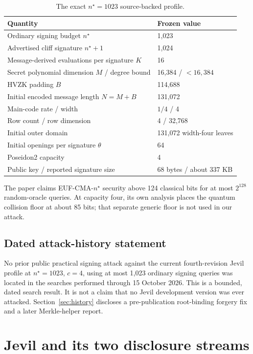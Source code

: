 \documentclass[10pt,a4paper]{article}
\begin{document}
\begin{table}[ht]
\centering
\small
\begin{tabular}{@{}ll@{}}
\toprule
Quantity & Frozen value \\
\midrule
Ordinary signing budget $n^\star$ & 1,023 \\
Advertised cliff signature $n^\star+1$ & 1,024 \\
Message-derived evaluations per signature $K$ & 16 \\
Secret polynomial dimension $M$ / degree bound & 16,384 / $<16{,}384$ \\
HVZK padding $B$ & 114,688 \\
Initial encoded message length $N=M+B$ & 131,072 \\
Main-code rate / width & $1/4$ / 4 \\
Row count / row dimension & 4 / 32,768 \\
Initial outer domain & 131,072 width-four leaves \\
Initial openings per signature $\theta$ & 64 \\
Poseidon2 capacity & 4 \\
Public key / reported signature size & 68 bytes / about 337 KB \\
\bottomrule
\end{tabular}
\caption{The exact $n^\star=1023$ source-backed profile.}
\label{tab:parameters}
\end{table}

The paper claims EUF-CMA-$n^\star$ security above 124 classical bits for at
most $2^{128}$ random-oracle queries. At capacity four, its own analysis places
the quantum collision floor at about 85 bits; that separate generic floor is
not used in our attack.

\subsection{Dated attack-history statement}

No prior public practical signing attack against the current fourth-revision
Jevil profile at $n^\star=1023$, $c=4$, using at most 1,023 ordinary signing
queries was located in the searches performed through 15 October 2026. This is
a bounded, dated search result. It is not a claim that no Jevil development
version was ever attacked. Section~\ref{sec:history} discloses a
pre-publication root-binding forgery fix and a later Merkle-helper report.

\section{Jevil and its two disclosure streams}
\label{sec:scheme}
\end{document}
